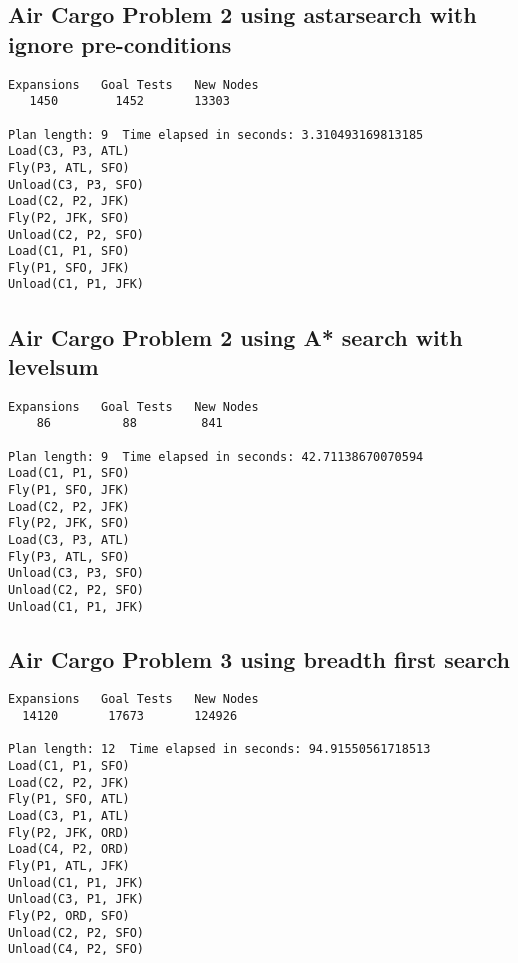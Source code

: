 \documentclass[11pt,a4paper]{report}
\begin{document}
\subsection*{Air Cargo Problem 2 using astarsearch with ignore pre-conditions}
\begin{verbatim}
Expansions   Goal Tests   New Nodes
   1450        1452       13303

Plan length: 9  Time elapsed in seconds: 3.310493169813185
Load(C3, P3, ATL)
Fly(P3, ATL, SFO)
Unload(C3, P3, SFO)
Load(C2, P2, JFK)
Fly(P2, JFK, SFO)
Unload(C2, P2, SFO)
Load(C1, P1, SFO)
Fly(P1, SFO, JFK)
Unload(C1, P1, JFK)
\end{verbatim}
\subsection*{Air Cargo Problem 2 using A* search with levelsum}
\begin{verbatim}
Expansions   Goal Tests   New Nodes
    86          88         841

Plan length: 9  Time elapsed in seconds: 42.71138670070594
Load(C1, P1, SFO)
Fly(P1, SFO, JFK)
Load(C2, P2, JFK)
Fly(P2, JFK, SFO)
Load(C3, P3, ATL)
Fly(P3, ATL, SFO)
Unload(C3, P3, SFO)
Unload(C2, P2, SFO)
Unload(C1, P1, JFK)
\end{verbatim}


\subsection*{Air Cargo Problem 3 using breadth first search}
\begin{verbatim}
Expansions   Goal Tests   New Nodes
  14120       17673       124926

Plan length: 12  Time elapsed in seconds: 94.91550561718513
Load(C1, P1, SFO)
Load(C2, P2, JFK)
Fly(P1, SFO, ATL)
Load(C3, P1, ATL)
Fly(P2, JFK, ORD)
Load(C4, P2, ORD)
Fly(P1, ATL, JFK)
Unload(C1, P1, JFK)
Unload(C3, P1, JFK)
Fly(P2, ORD, SFO)
Unload(C2, P2, SFO)
Unload(C4, P2, SFO)
\end{verbatim}
\end{document}
